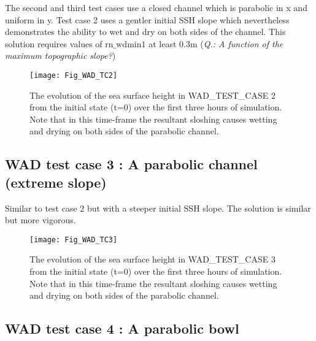 The second and third test cases use a closed channel which is parabolic in x and uniform
in y.  Test case 2 uses a gentler initial SSH slope which nevertheless demonstrates the
ability to wet and dry on both sides of the channel. This solution requires values of
$\mathrm{rn\_wdmin1}$ at least 0.3m ({\it Q.: A function of the maximum topographic
slope?})


\begin{figure}[htb] \begin{center}
\texttt{[image: Fig\_WAD\_TC2]}
\caption{ \label{Fig_WAD_TC2}
The evolution of the sea surface height in WAD\_TEST\_CASE 2 from the initial state (t=0)
over the first three hours of simulation. Note that in this time-frame the resultant sloshing
causes wetting and drying on both sides of the parabolic channel.}
\end{center}\end{figure}

\clearpage
\subsection [WAD test case 3 : A parabolic channel (extreme slope) ]
                    {WAD test case 3 : A parabolic channel (extreme slope)}
\label{WAD_test_case3}

Similar to test case 2 but with a steeper initial SSH slope. The solution is similar but more vigorous.


\begin{figure}[htb] \begin{center}
\texttt{[image: Fig\_WAD\_TC3]}
\caption{ \label{Fig_WAD_TC3}
The evolution of the sea surface height in WAD\_TEST\_CASE 3 from the initial state (t=0)
over the first three hours of simulation. Note that in this time-frame the resultant sloshing
causes wetting and drying on both sides of the parabolic channel.}
\end{center}\end{figure}

\clearpage
\subsection [WAD test case 4 : A parabolic bowl ]
                    {WAD test case 4 : A parabolic bowl}
\label{WAD_test_case4}

